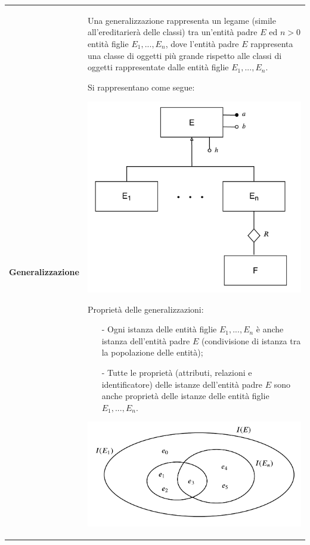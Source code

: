 \documentclass[a4paper, 10pt]{report}
\begin{document}
\begin{longtable}{| p{} | p{} |}
\textbf{Generalizzazione} & Una generalizzazione rappresenta un legame (simile all'ereditarierà delle classi) tra un'entità padre $E$ ed $n > 0$ entità figlie $E_1,...,E_n$, dove l'entità padre $E$ rappresenta una classe di oggetti più grande rispetto alle classi di oggetti rappresentate dalle entità figlie $E_1,...,E_n$.

Si rappresentano come segue:

\begin{center}
\includegraphics[scale=0.4]{21ottobre01.pdf}
\end{center}

Proprietà delle generalizzazioni:
\begin{itemize}
\item[-] Ogni istanza delle entità figlie $E_1,...,E_n$ è anche istanza dell'entità padre $E$ (condivisione di istanza tra la popolazione delle entità);
\item[-] Tutte le proprietà (attributi, relazioni e identificatore) delle istanze dell'entità padre $E$ sono anche proprietà delle istanze delle entità figlie $E_1,...,E_n$.  
\end{itemize}

\begin{center}
\includegraphics[scale=0.4]{21ottobre02.pdf}


\end{center}
\end{longtable}
\end{document}
